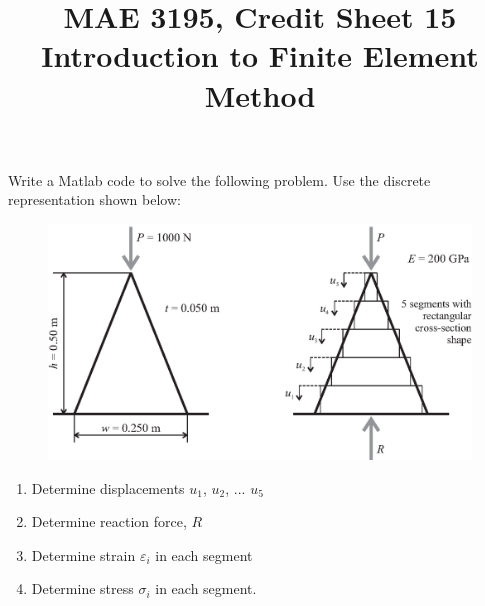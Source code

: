 \documentclass[12pt]{article}
\title{MAE 3195, Credit Sheet 15\\ Introduction to Finite Element Method}
\date{}
\begin{document}
\maketitle

Write a Matlab code to solve the following problem. Use the discrete representation shown below:

\begin{figure}[htb]
	\begin{center}
		\includegraphics[width=6.in]{triangle.eps}
	\end{center}
\end{figure}

\begin{enumerate}
	\item Determine displacements $u_1$, $u_2$, ... $u_5$
	\item Determine reaction force, $R$
	\item Determine strain $\varepsilon_i$ in each segment
	\item Determine stress $\sigma_i$ in each segment.
\end{enumerate}
\end{document}
